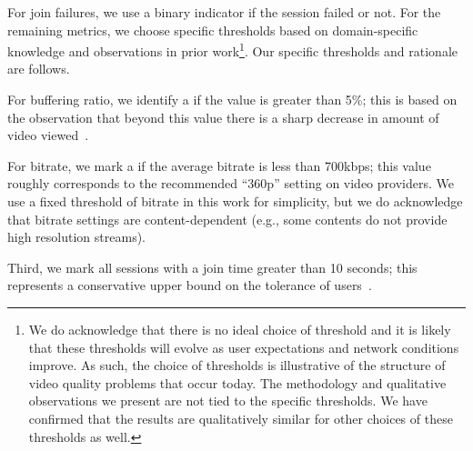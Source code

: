 \begin{packeditemize}
\item For join failures, we use a binary indicator if the 
session failed or not.  
For the remaining metrics, we choose specific 
thresholds based on domain-specific
knowledge and observations in prior work\footnote{
We do acknowledge that there is no ideal choice of 
threshold and it is likely that these thresholds will evolve 
as user expectations and network conditions improve. 
As such, the choice of thresholds is illustrative of the 
structure of video quality problems that occur today. 
The methodology and qualitative observations we 
present are not  tied to the  specific  thresholds.
We have confirmed that the results are qualitatively 
similar for other choices  of these thresholds as well. }.  
Our specific thresholds and rationale are follows.
\item For buffering ratio, we identify a \problemsession 
if the value is greater than 5\%; this is based on the 
observation that beyond this value there is a sharp 
decrease in amount of video viewed~\cite{sigcomm11}.  
\item For bitrate, we mark a \problemsession if the average
bitrate is less than 700kbps; this value roughly
 corresponds to the recommended ``360p'' setting on 
 video providers. 
We use a fixed threshold of bitrate in this work for 
simplicity, but we do acknowledge that bitrate settings 
are content-dependent (e.g., some contents do not provide 
high resolution streams).
\item Third,  we mark all sessions with a join
time greater than 10 seconds; this represents a 
conservative upper bound on the
tolerance of users~\cite{webhci1,akamai-imc12}.  
\end{packeditemize}

